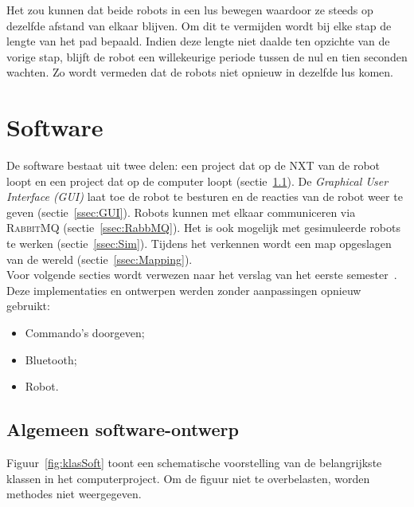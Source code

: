 \documentclass[eind]{penoverslag}
\begin{document}
Het zou kunnen dat beide robots in een lus bewegen waardoor ze steeds op dezelfde afstand van elkaar blijven. Om dit te vermijden wordt bij elke stap de lengte van het pad bepaald. Indien deze lengte niet daalde ten opzichte van de vorige stap, blijft de robot een willekeurige periode tussen de nul en tien seconden wachten. Zo wordt vermeden dat de robots niet opnieuw in dezelfde lus komen.


\section{Software}
\label{sec:Softw}
De software bestaat uit twee delen: een project dat op de \textsc{NXT} van de robot loopt en een project dat op de computer loopt (sectie~\ref{ssec:Sdesign}). De \textit{Graphical User Interface (GUI)} laat toe de robot te besturen en de reacties van de robot weer te geven (sectie~\ref{ssec:GUI}). Robots kunnen met elkaar communiceren via \textsc{RabbitMQ} (sectie~\ref{ssec:RabbMQ}). Het is ook mogelijk met gesimuleerde robots te werken (sectie~\ref{ssec:Sim}). Tijdens het verkennen wordt een map opgeslagen van de wereld (sectie~\ref{ssec:Mapping}).\\

Voor volgende secties wordt verwezen naar het verslag van het eerste semester~\cite{Verslag1}. Deze implementaties en ontwerpen werden zonder aanpassingen opnieuw gebruikt:

\begin{itemize}
\item Commando's doorgeven;
\item Bluetooth;
\item Robot.
\end{itemize}

\subsection{Algemeen software-ontwerp}
\label{ssec:Sdesign}
Figuur~\ref{fig:klasSoft} toont een schematische voorstelling van de belangrijkste klassen in het computerproject. Om de figuur niet te overbelasten, worden methodes niet weergegeven.\\
\end{document}
